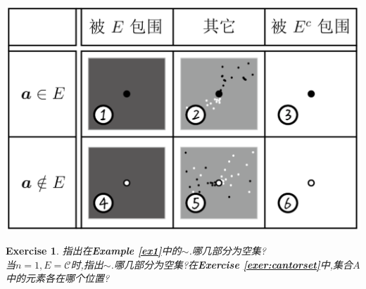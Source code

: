 \documentclass[12pt,A4paper,oneside]{amsart}
\numberwithin{equation}{section}
\theoremstyle{plain}
\theoremstyle{plain}
\newtheorem{exercise}{Exercise}[section]
\theoremstyle{plain}
\numberwithin{equation}{section}
\theoremstyle{remark}
\newcommand*{\thick}[1]{\text{\boldmath$#1$}}
\begin{document}
\begin{table}[ht]
	\centering
\renewcommand\arraystretch{2}
    \includegraphics[width=.5\textwidth]{figures/bigtable.png}\\
	\caption{对$\mathbb{R}^n$彻底的分类}
	\label{bigtable1}
\end{table}

\begin{exercise}
	\label{exer:classify}
	指出在\textbf{Example \ref{ex1}}中的$\sim$.哪几部分为空集?\\
	当$n=1,E=\mathcal{C}$时,指出$\sim$.哪几部分为空集?在\textbf{Exercise \ref{exer:cantorset}}中,集合$A$中的元素各在哪个位置?
\end{exercise}
\end{document}
